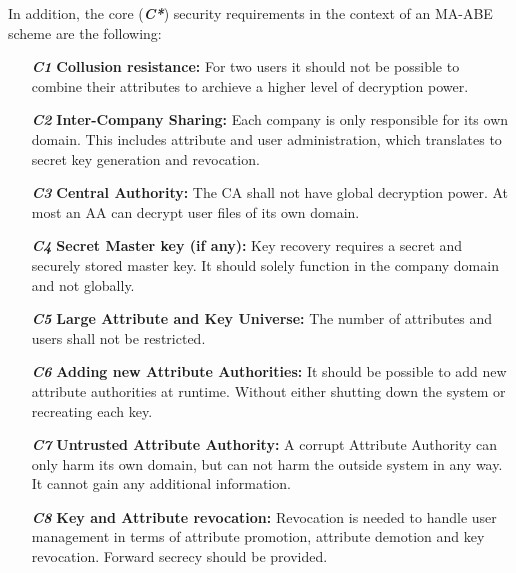 In addition, the core (\textbf{\textit{C*}}) security requirements in the context of an MA-ABE scheme are the following:
\begin{itemize}
\item[\textit{\textbf{C1}}] \textbf{Collusion resistance:} For two users it should not be possible to combine their attributes to archieve a higher level of decryption power.
\item[\textit{\textbf{C2}}] \textbf{Inter-Company Sharing:} Each company is only responsible for its own domain. This includes attribute and user administration, which translates to secret key generation and revocation. %
\item[\textit{\textbf{C3}}] \textbf{Central Authority:} The CA shall not have global decryption power. At most an AA can decrypt user files of its own domain.  
\item[\textit{\textbf{C4}}] \textbf{Secret Master key (if any):} Key recovery requires a secret and securely stored master key. It should solely function in the company domain and not globally. 
\item[\textit{\textbf{C5}}] \textbf{Large Attribute and Key Universe:} The number of attributes and users shall not be restricted.
\item[\textit{\textbf{C6}}] \textbf{Adding new Attribute Authorities:} It should be possible to add new attribute authorities at runtime. Without either shutting down the system or recreating each key.
\item[\textit{\textbf{C7}}] \textbf{Untrusted Attribute Authority:} A corrupt Attribute Authority can only harm its own domain, but can not harm the outside system in any way. It cannot gain any additional information.
\item[\textit{\textbf{C8}}] \textbf{Key and Attribute revocation:} Revocation is needed to handle user management in terms of attribute promotion, attribute demotion and key revocation. Forward secrecy should be provided. 
\end{itemize}

